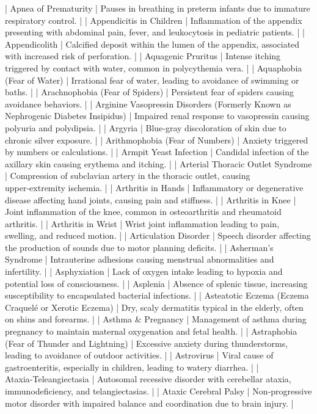 | Apnea of Prematurity | Pauses in breathing in preterm infants due to immature respiratory control. |
| Appendicitis in Children | Inflammation of the appendix presenting with abdominal pain, fever, and leukocytosis in pediatric patients. |
| Appendicolith | Calcified deposit within the lumen of the appendix, associated with increased risk of perforation. |
| Aquagenic Pruritus | Intense itching triggered by contact with water, common in polycythemia vera. |
| Aquaphobia (Fear of Water) | Irrational fear of water, leading to avoidance of swimming or baths. |
| Arachnophobia (Fear of Spiders) | Persistent fear of spiders causing avoidance behaviors. |
| Arginine Vasopressin Disorders (Formerly Known as Nephrogenic Diabetes Insipidus) | Impaired renal response to vasopressin causing polyuria and polydipsia. |
| Argyria | Blue‑gray discoloration of skin due to chronic silver exposure. |
| Arithmophobia (Fear of Numbers) | Anxiety triggered by numbers or calculations. |
| Armpit Yeast Infection | Candidal infection of the axillary skin causing erythema and itching. |
| Arterial Thoracic Outlet Syndrome | Compression of subclavian artery in the thoracic outlet, causing upper‑extremity ischemia. |
| Arthritis in Hands | Inflammatory or degenerative disease affecting hand joints, causing pain and stiffness. |
| Arthritis in Knee | Joint inflammation of the knee, common in osteoarthritis and rheumatoid arthritis. |
| Arthritis in Wrist | Wrist joint inflammation leading to pain, swelling, and reduced motion. |
| Articulation Disorder | Speech disorder affecting the production of sounds due to motor planning deficits. |
| Asherman’s Syndrome | Intrauterine adhesions causing menstrual abnormalities and infertility. |
| Asphyxiation | Lack of oxygen intake leading to hypoxia and potential loss of consciousness. |
| Asplenia | Absence of splenic tissue, increasing susceptibility to encapsulated bacterial infections. |
| Asteatotic Eczema (Eczema Craquelé or Xerotic Eczema) | Dry, scaly dermatitis typical in the elderly, often on shins and forearms. |
| Asthma & Pregnancy | Management of asthma during pregnancy to maintain maternal oxygenation and fetal health. |
| Astraphobia (Fear of Thunder and Lightning) | Excessive anxiety during thunderstorms, leading to avoidance of outdoor activities. |
| Astrovirus | Viral cause of gastroenteritis, especially in children, leading to watery diarrhea. |
| Ataxia‑Teleangiectasia | Autosomal recessive disorder with cerebellar ataxia, immunodeficiency, and telangiectasias. |
| Ataxic Cerebral Palsy | Non‑progressive motor disorder with impaired balance and coordination due to brain injury. |
